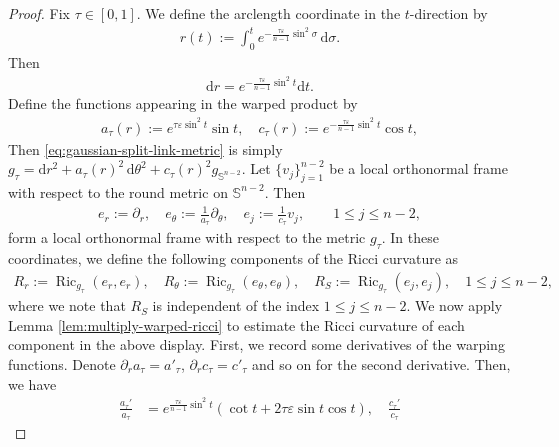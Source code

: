 \documentclass[11pt,reqno]{amsart}
\numberwithin{equation}{section}
\theoremstyle{definition}
\theoremstyle{remark}
\newcommand{\ta}{\tau}
\newcommand{\ud}{\mathrm{d}}
\newcommand{\0}{\emptyset}
\newcommand{\veps}{\varepsilon}
\newcommand{\bbS}{\mathbb S}
\newcommand{\Ric}{\operatorname{Ric}}
\begin{document}
\begin{proof}
Fix $\ta\in[0,1]$. We define the arclength coordinate in the $t$-direction by
\begin{align}\label{eq:gaussian-split-link-arclength}
        r(t)
        :=
        \int_0^t
        e^{-\frac{\ta\veps}{n-1}\sin^2\sigma}\,\ud\sigma.
\end{align}
Then
\begin{align}\label{eq:gaussian-split-r-t-derivative}
        \ud r 
        =
        e^{-\frac{\ta\veps}{n-1}\sin^2t}
        \ud t.
\end{align}
Define the functions appearing in the warped product by
\begin{align}\label{eq:gaussian-split-link-warping-functions}
        a_\ta(r)
        :=
        e^{\ta\veps\sin^2t}\sin t,\quad 
        c_\ta(r)
        :=
        e^{-\frac{\ta\veps}{n-1}\sin^2t}\cos t,
\end{align}
Then \eqref{eq:gaussian-split-link-metric} is simply $ g_\ta =\ud r^2+ a_\ta(r)^2\,\ud\theta^2+c_\ta(r)^2g_{\bbS^{n-2}}.$  Let $\{v_j\}_{j=1}^{n-2}$ be a local orthonormal frame with respect to the round metric on $\bbS^{n-2}$. Then
\begin{align}
        e_r
        :=
        \partial_r,\quad
        e_\theta
        :=
        \frac1{a_\ta}\partial_\theta,\quad 
        e_j
        :=
        \frac1{c_\ta}v_j,
        \qquad
        1\leq j\leq n-2,
\end{align}
form a local orthonormal frame with respect to the metric $g_\ta$. In these coordinates, we define the following components of the Ricci curvature as
\begin{align}\label{eq:gaussian-split-link-Ricci-eigenvalue-definitions}
        R_r
        :=
        \Ric_{g_\ta}(e_r,e_r),\quad 
        R_\theta
        :=
        \Ric_{g_\ta}(e_\theta,e_\theta),\quad 
        R_S
        :=
        \Ric_{g_\ta}(e_j,e_j),
        \quad
        1\leq j\leq n-2,
\end{align}
where we note that $R_S$ is independent of the index $1\leq j\leq n-2$. We now apply Lemma \ref{lem:multiply-warped-ricci} to estimate the Ricci curvature of each component in the above display. First, we record some derivatives of the warping functions. Denote $\partial_r a_\ta =a'_\ta$, $\partial_r c_\ta=c'_\ta$ and so on for the second derivative. Then, we have 
\begin{align}
        \frac{a_\ta'}{a_\ta}
        &=
        e^{\frac{\ta\veps}{n-1}\sin^2t}
        \left(
        \cot t
        +
        2\ta\veps\sin t\cos t
        \right),\quad 
        \frac{c_\ta'}{c_\ta}

\end{align}
\end{proof}
\end{document}
